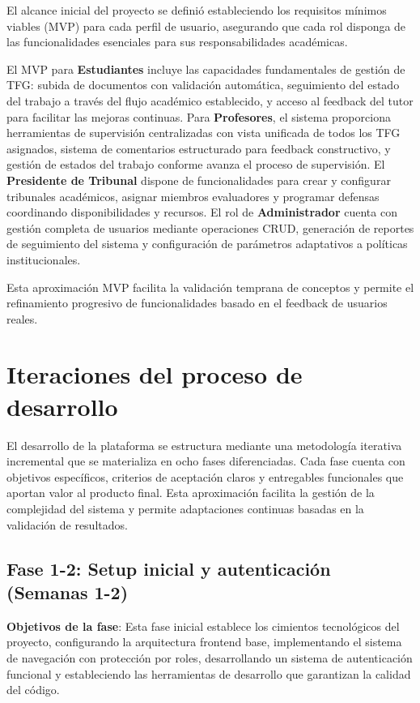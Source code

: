 \documentclass[12pt,a4paper,oneside]{report}
\begin{document}
El alcance inicial del proyecto se definió estableciendo los requisitos mínimos viables (MVP) para cada perfil de usuario, asegurando que cada rol disponga de las funcionalidades esenciales para sus responsabilidades académicas.

El MVP para \textbf{Estudiantes} incluye las capacidades fundamentales de gestión de TFG: subida de documentos con validación automática, seguimiento del estado del trabajo a través del flujo académico establecido, y acceso al feedback del tutor para facilitar las mejoras continuas. Para \textbf{Profesores}, el sistema proporciona herramientas de supervisión centralizadas con vista unificada de todos los TFG asignados, sistema de comentarios estructurado para feedback constructivo, y gestión de estados del trabajo conforme avanza el proceso de supervisión. El \textbf{Presidente de Tribunal} dispone de funcionalidades para crear y configurar tribunales académicos, asignar miembros evaluadores y programar defensas coordinando disponibilidades y recursos. El rol de \textbf{Administrador} cuenta con gestión completa de usuarios mediante operaciones CRUD, generación de reportes de seguimiento del sistema y configuración de parámetros adaptativos a políticas institucionales.

Esta aproximación MVP facilita la validación temprana de conceptos y permite el refinamiento progresivo de funcionalidades basado en el feedback de usuarios reales.

\section{Iteraciones del proceso de
desarrollo}\label{iteraciones-del-proceso-de-desarrollo}

El desarrollo de la plataforma se estructura mediante una metodología iterativa incremental que se materializa en ocho fases diferenciadas. Cada fase cuenta con objetivos específicos, criterios de aceptación claros y entregables funcionales que aportan valor al producto final. Esta aproximación facilita la gestión de la complejidad del sistema y permite adaptaciones continuas basadas en la validación de resultados.

\subsection{Fase 1-2: Setup inicial y autenticación (Semanas
1-2)}\label{fase-1-2-setup-inicial-y-autenticaciuxf3n-semanas-1-2}

\textbf{Objetivos de la fase}: Esta fase inicial establece los cimientos tecnológicos del proyecto, configurando la arquitectura frontend base, implementando el sistema de navegación con protección por roles, desarrollando un sistema de autenticación funcional y estableciendo las herramientas de desarrollo que garantizan la calidad del código.
\end{document}
